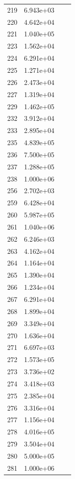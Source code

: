 \documentclass[12pt]{article}
\begin{document}
\begin{longtable}{@{}cccc@{}}
219 & 6.943e+03 &  &  \\
220 & 4.642e+04 &  &  \\
221 & 1.040e+05 &  &  \\
223 & 1.562e+04 &  &  \\
224 & 6.291e+04 &  &  \\
225 & 1.271e+04 &  &  \\
226 & 2.473e+04 &  &  \\
227 & 1.319e+04 &  &  \\
229 & 1.462e+05 &  &  \\
232 & 3.912e+04 &  &  \\
233 & 2.895e+04 &  &  \\
235 & 4.839e+05 &  &  \\
236 & 7.500e+05 &  &  \\
237 & 1.288e+05 &  &  \\
238 & 1.000e+06 &  &  \\
256 & 2.702e+03 &  &  \\
259 & 6.428e+04 &  &  \\
260 & 5.987e+05 &  &  \\
261 & 1.040e+06 &  &  \\
262 & 6.246e+03 &  &  \\
263 & 4.162e+04 &  &  \\
264 & 1.164e+04 &  &  \\
265 & 1.390e+04 &  &  \\
266 & 1.234e+04 &  &  \\
267 & 6.291e+04 &  &  \\
268 & 1.899e+04 &  &  \\
269 & 3.349e+04 &  &  \\
270 & 1.636e+04 &  &  \\
271 & 6.697e+03 &  &  \\
272 & 1.573e+05 &  &  \\
273 & 3.736e+02 &  &  \\
274 & 3.418e+03 &  &  \\
275 & 2.385e+04 &  &  \\
276 & 3.316e+04 &  &  \\
277 & 1.156e+04 &  &  \\
278 & 4.016e+05 &  &  \\
279 & 3.504e+04 &  &  \\
280 & 5.000e+05 &  &  \\
281 & 1.000e+06 &  &  \\

\bottomrule
\end{longtable}
\end{document}

